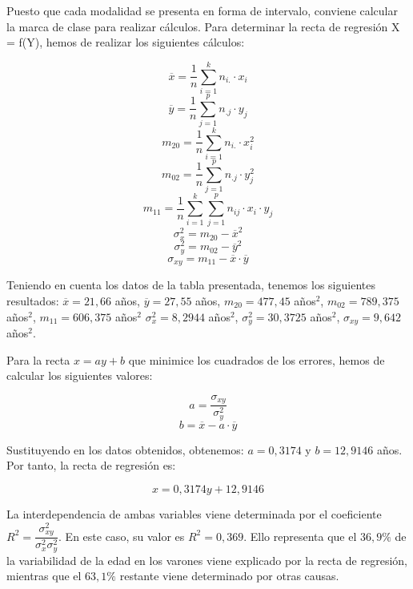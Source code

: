 \normalsize

Puesto que cada modalidad se presenta en forma de intervalo, conviene calcular la marca de clase para realizar cálculos. Para determinar la recta de regresión X = f(Y), hemos de realizar los siguientes cálculos:
	
	$$\overline{x} = \frac{1}{n}\sum_{i=1}^{k}n_{i.}·x_i$$
	$$\overline{y} = \frac{1}{n}\sum_{j=1}^{p}n_{.j}·y_j$$
	$$m_{20} = \frac{1}{n}\sum_{i=1}^{k}n_{i.}·x_i^2$$
	$$m_{02} = \frac{1}{n}\sum_{j=1}^{p}n_{.j}·y_j^2$$
	$$m_{11} = \frac{1}{n}\sum_{i=1}^{k}\sum_{j=1}^{p}n_{ij}·x_i·y_j$$
	$$ \sigma_x^2 = m_{20} - \overline{x}^2$$
	$$ \sigma_y^2 = m_{02} - \overline{y}^2$$
	$$ \sigma_{xy} = m_{11} - \overline{x}·\overline{y}$$
	
Teniendo en cuenta los datos de la tabla presentada, tenemos los siguientes resultados: $\overline{x} = 21,66$ años, $\overline{y} = 27,55$ años, $m_{20} = 477,45$ años$^2$, $m_{02} = 789,375$ años$^2$, $m_{11} = 606,375$ años$^2$ $ \sigma_x^2 = 8,2944$ años$^2$, $ \sigma_y^2 = 30,3725$ años$^2$, $ \sigma_{xy} =9,642$ años$^2$.
	
Para la recta $x = ay + b$ que minimice los cuadrados de los errores, hemos de calcular los siguientes valores:

$$a = \frac{\sigma_{xy}}{\sigma_y^2}$$
$$b = \overline{x} - a·\overline{y}$$

Sustituyendo en los datos obtenidos, obtenemos: $a=0,3174$ y $b=12,9146$ años. Por tanto, la recta de regresión es:

$$ x = 0,3174y + 12,9146 $$

La interdependencia de ambas variables viene determinada por el coeficiente $R^2 = \dfrac{\sigma_{xy}^2}{\sigma_x^2\sigma_y^2}$. En este caso, su valor es $R^2 = 0,369$. Ello representa que el $36,9 \%$ de la variabilidad de la edad en los varones viene explicado por la recta de regresión, mientras que el $63,1 \%$ restante viene determinado por otras causas. 